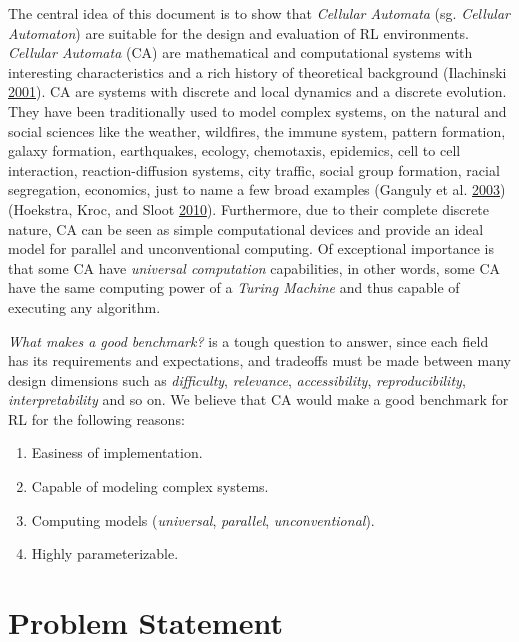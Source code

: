 \documentclass[
  12pt,
  openany]{book}
\providecommand{\tightlist}{%
  \setlength{\itemsep}{0pt}\setlength{\parskip}{0pt}}
\begin{document}
The central idea of this document is to show that \emph{Cellular Automata} (sg. \emph{Cellular Automaton}) are suitable for the design and evaluation of RL environments. \emph{Cellular Automata} (CA) are mathematical and computational systems with interesting characteristics
and a rich history of theoretical background (Ilachinski \protect\hyperlink{ref-ilachinski2001cellular}{2001}). CA are systems with discrete and local dynamics and a discrete evolution. They have been traditionally used to model complex systems, on the natural and social sciences like the weather, wildfires, the immune system, pattern formation, galaxy formation, earthquakes, ecology, chemotaxis, epidemics, cell to cell interaction, reaction-diffusion systems, city traffic, social group formation, racial segregation, economics, just to name a few broad examples (Ganguly et al. \protect\hyperlink{ref-ganguly2003survey}{2003})(Hoekstra, Kroc, and Sloot \protect\hyperlink{ref-hoekstra2010simulating}{2010}). Furthermore, due to their complete discrete nature, CA can be seen as simple computational devices and provide an ideal model for parallel and unconventional computing. Of exceptional importance is that some CA have \emph{universal computation} capabilities, in other words, some CA have the same computing power of a \emph{Turing Machine} and thus capable of executing any algorithm.

\emph{What makes a good benchmark?} is a tough question to answer, since each field has its requirements and expectations, and tradeoffs must be made between many design dimensions such as \emph{difficulty}, \emph{relevance}, \emph{accessibility}, \emph{reproducibility}, \emph{interpretability} and so on. We believe that CA would make a good benchmark for RL for the following reasons:

\begin{enumerate}
\def\labelenumi{\arabic{enumi}.}
\tightlist
\item
  Easiness of implementation.
\item
  Capable of modeling complex systems.
\item
  Computing models (\emph{universal}, \emph{parallel}, \emph{unconventional}).
\item
  Highly parameterizable.
\end{enumerate}

\hypertarget{problem-statement}{%
\section{Problem Statement}\label{problem-statement}}
\end{document}
